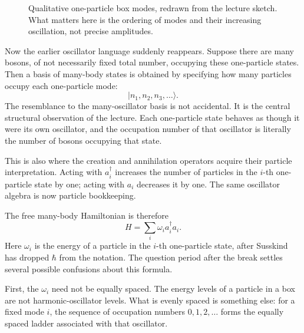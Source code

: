 \begin{figure}[ht]
\centering
{}
\caption{Qualitative one-particle box modes, redrawn from the lecture sketch. What matters here is the ordering of modes and their increasing oscillation, not precise amplitudes.}
\end{figure}

Now the earlier oscillator language suddenly reappears. Suppose there are many bosons, of not necessarily fixed total number, occupying these one-particle states. Then a basis of many-body states is obtained by specifying how many particles occupy each one-particle mode:
\begin{equation}
|n_1,n_2,n_3,\ldots\rangle.
\end{equation}
The resemblance to the many-oscillator basis is not accidental. It is the central structural observation of the lecture. Each one-particle state behaves as though it were its own oscillator, and the occupation number of that oscillator is literally the number of bosons occupying that state.

This is also where the creation and annihilation operators acquire their particle interpretation. Acting with \(a_i^\dagger\) increases the number of particles in the \(i\)-th one-particle state by one; acting with \(a_i\) decreases it by one. The same oscillator algebra is now particle bookkeeping.

The free many-body Hamiltonian is therefore
\begin{equation}
H=\sum_i \omega_i a_i^\dagger a_i.
\end{equation}
Here \(\omega_i\) is the energy of a particle in the \(i\)-th one-particle state, after Susskind has dropped \(\hbar\) from the notation. The question period after the break settles several possible confusions about this formula.

First, the \(\omega_i\) need not be equally spaced. The energy levels of a particle in a box are not harmonic-oscillator levels. What is evenly spaced is something else: for a fixed mode \(i\), the sequence of occupation numbers \(0,1,2,\ldots\) forms the equally spaced ladder associated with that oscillator.

